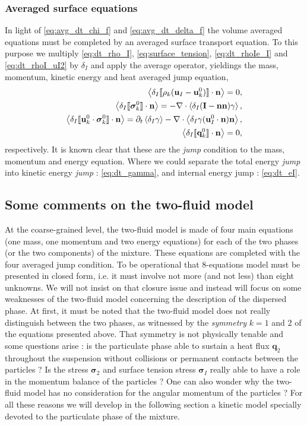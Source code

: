 \subsubsection{Averaged surface equations}
In light of \ref{eq:avg_dt_chi_f} and \ref{eq:avg_dt_delta_f} the volume averaged equations must be completed by an averaged surface transport equation.  
To this purpose we multiply \ref{eq:dt_rho_I}, \ref{eq:surface_tension}, \ref{eq:dt_rhoIe_I} and \ref{eq:dt_rhoI_uI2} by $\delta_I$ and apply the average operator, yieldings the mass, momentum, kinetic energy and heat averaged jump equation, 
\begin{align}
    \label{eq:dt_rho_I}
    \left<\delta_I \llbracket \rho_k (\textbf{u}_I - \textbf{u}_k^0) \rrbracket \cdot \textbf{n}\right>
    = 0,\\
    \label{eq:dt_uI}
    \left<\delta_I \llbracket \bm{\sigma}^0_k \rrbracket \cdot \textbf{n}\right>
    = - \mathbf{\nabla}\cdot \left<\delta_I (\textbf{I} - \textbf{nn}) \gamma\right>,\\
    \label{eq:dt_gamma}
    \left<\delta_I \llbracket \textbf{u}_k^0 \cdot \bm{\sigma}^0_k \rrbracket \cdot \textbf{n}\right>
    = \partial_t \left<\delta_I \gamma\right>
    - \mathbf{\nabla}\cdot \left<\delta_I \gamma (\textbf{u}_{I}^0 \cdot \textbf{n})\textbf{n} \right>,\\
    \label{eq:dt_eI}
    \left<\delta_I \llbracket \textbf{q}^0_k \rrbracket \cdot \textbf{n}\right>
     = 0,
\end{align}
respectively. 
It is known clear that these are the \textit{jump} condition to the mass, momentum and energy equation. 
Where we could separate the total energy \textit{jump} into kinetic energy \textit{jump} : \ref{eq:dt_gamma}, and internal energy jump : \ref{eq:dt_eI}. 

\subsection{Some comments on the two-fluid model}

At the coarse-grained level, the two-fluid model is made of four main equations
(one mass, one momentum and two energy equations) for each of the two phases
(or the two components) of the mixture. 
These equations are completed with the four averaged jump condition.  
To be operational that 8-equations
model must be presented in closed form, i.e. it must involve not more (and
not less) than eight unknowns. 
We will not insist on that closure issue and
instead will focus on some weaknesses of the two-fluid model concerning the
description of the dispersed phase. 
At first, it must be noted that the two-fluid model does not really distinguish between the two phases, as witnessed by the
\textit{symmetry} $k = 1$ and $2$ of the equations presented above. That symmetry
is not physically tenable and some questions arise : is the particulate phase
able to sustain a heat flux $\textbf{q}_2$ throughout the suspension without collisions or permanent contacts between the particles ? Is the stress $\bm{\sigma}_2$ and surface tension stress $\bm{\sigma}_I$ really able to have a role in the momentum balance of the particles ? 
One can also wonder why the two-fluid model has no consideration for the angular momentum of the particles ? 
For all these reasons we will develop in the following section a kinetic model
specially devoted to the particulate phase of the mixture.
